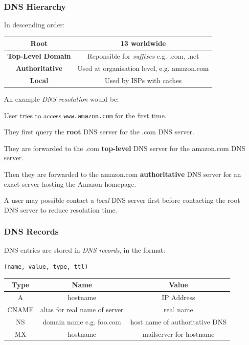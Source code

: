 \documentclass{article}
\begin{document}
\subsubsection{DNS Hierarchy}

In descending order:

\begin{center}
  \begin{tabular}{|c|c|}
    \hline
    \textbf{Root} & 13 worldwide\\
    \hline
    \textbf{Top-Level Domain} & Reponsible for \textit{suffixes} e.g. .com, .net\\
    \hline
    \textbf{Authoritative} & Used at organisation level, e.g. amazon.com\\
    \hline
    \textbf{Local} & Used by ISPs with caches\\
    \hline
  \end{tabular}
\end{center}

An example \textit{DNS resolution} would be:

User tries to access \texttt{www.amazon.com} for the first time.

They first query the \textbf{root} DNS server for the .com DNS server.

They are forwarded to the .com \textbf{top-level} DNS server for the amazon.com DNS server.

Then they are forwarded to the amazon.com \textbf{authoritative} DNS server for an exact server hosting the Amazon homepage.

A user may possible contact a \textit{local} DNS server first before contacting the root DNS server to reduce resolution time.

\subsubsection{DNS Records}

DNS entries are stored in \textit{DNS records}, in the format:

\begin{center}
  
  \texttt{(name, value, type, ttl)}

  \begin{tabular}{|c|c|c|}
    \hline
    \textbf{Type} & \textbf{Name} & \textbf{Value} \\
    \hline
    A & hostname & IP Address\\
    \hline
    CNAME & alias for real name of server & real name\\
    \hline
    NS & domain name e.g. foo.com & host name of authoritative DNS\\
    \hline
    MX & hostname & mailserver for hostname\\
    \hline
  \end{tabular}
\end{center}
\end{document}
